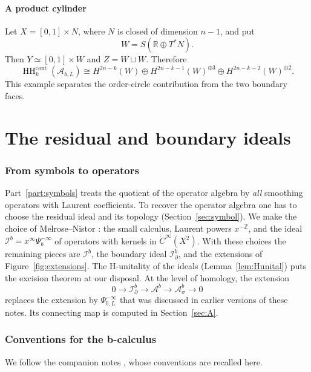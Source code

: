\documentclass[11pt,oneside,reqno]{article}
\DeclareMathOperator{\HH}{HH}
\newcommand{\Z}{\mathbb Z}
\newcommand{\cA}{\mathcal A}
\newcommand{\Ib}{\mathcal I^b}
\newcommand{\Idb}{\mathcal I^b_\partial}
\newcommand{\Ab}{\mathcal A^b}
\newcommand{\Asb}{\mathcal A^b_\sigma}
\theoremstyle{plain}
\theoremstyle{definition}
\theoremstyle{remark}
\begin{document}
\subsection{A product cylinder}

Let \(X=[0,1]\times N\), where \(N\) is closed of dimension \(n-1\), and put
\[
 W=S(\mathbb R\oplus T^*N).
\]
Then \(Y\simeq[0,1]\times W\) and \(Z=W\sqcup W\). Therefore
\[
 \HH_k^{\mathrm{cont}}(\cA_{b,L})
 \cong H^{2n-k}(W)
 \oplus H^{2n-k-1}(W)^{\oplus3}
 \oplus H^{2n-k-2}(W)^{\oplus2}.
\]
This example separates the order-circle contribution from the two boundary
faces.

\part{The residual and boundary ideals}\label{part:ideals}

\section{From symbols to operators}\label{sec:unreduced}

Part~\ref{part:symbols} treats the quotient of the operator algebra by
\emph{all} smoothing operators with Laurent coefficients. To recover the
operator algebra one has to choose the residual ideal and its topology
(Section~\ref{sec:symbol}). We make the choice of Melrose--Nistor
\cite[(8)--(10)]{MN}: the small calculus, Laurent powers \(x^{-\Z}\), and the
ideal \(\Ib=x^\infty\Psi_b^{-\infty}\) of operators with kernels in
\(\dot C^\infty(X^2)\). With these choices the remaining pieces are
\(\Ib\), the boundary ideal \(\Idb\), and the extensions of
Figure~\ref{fig:extensions}. The H-unitality of the ideals
(Lemma~\ref{lem:Hunital}) puts the excision theorem at our disposal. At
the level of homology, the extension
\[
 0\to\Idb\to\Ab\to\Asb\to0
\]
replaces the extension by \(\Psi_{b,L}^{-\infty}\) that was discussed in
earlier versions of these notes. Its connecting map is computed in
Section~\ref{sec:A}.

\section{Conventions for the b-calculus}\label{sec:bconv}

We follow the companion notes \cite{Notes}, whose conventions are recalled
here.
\end{document}

